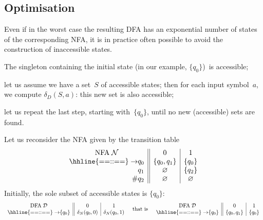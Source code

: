 \subsection*{Optimisation}

Even if in the worst case the resulting DFA has an exponential number
of states of the corresponding NFA, it is in practice often possible
to avoid the construction of inaccessible states.
\begin{itemize*}

  \item The singleton containing the initial state (in our example,
  \(\{q_0\}\))~is accessible;

  \item let us assume we have a set~\(S\) of accessible states; then
    for each input symbol~\(a\), we compute \(\delta_D(S,a)\): this
    new set is also accessible;

  \item let us repeat the last step, starting with~\(\{q_0\}\), until
    no new (accessible) sets are found.

\end{itemize*}
Let us reconsider the NFA given by the transition table
\begin{equation*}
  \begin{array}{r@{}l||c|c}
    \multicolumn{2}{c||}{\text{NFA} \; \mathcal{N}} & 0 & 1\\
    \hhline{==::==}
    \rightarrow & q_0 & \{q_0, q_1\} & \{q_0\}\\
                & q_1 & \varnothing  & \{q_2\}\\
    \#          & q_2 & \varnothing  & \varnothing
  \end{array}
\end{equation*}
Initially, the sole subset of accessible states is \(\{q_0\}\):
\begin{equation*}
  \begin{array}{r@{}l||c|c}
    \multicolumn{2}{c||}{\text{DFA} \; \mathcal{D}} & 0 & 1\\
    \hhline{==::==}
    \rightarrow & \{q_0\} & \delta_N(q_0,0) & \delta_N(q_0,1)
  \end{array}
\quad\text{that is}\quad
  \begin{array}{r@{}l||c|c}
    \multicolumn{2}{c||}{\text{DFA} \; \mathcal{D}} & 0 & 1\\
    \hhline{==::==}
    \rightarrow & \{q_0\} & \{q_0,q_1\} & \{q_0\}
  \end{array}
\end{equation*}
